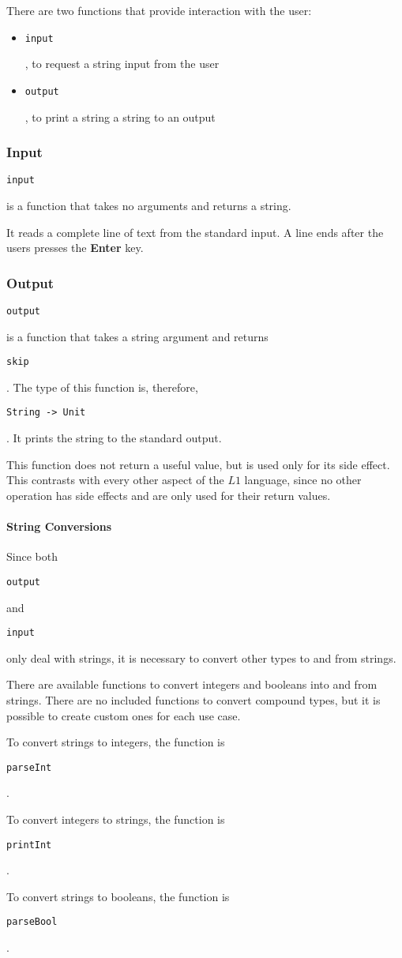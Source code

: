 \documentclass{article}
\def\code#1{\begin{footnotesize}\texttt{#1}\end{footnotesize}}
\begin{document}
There are two functions that provide interaction with the user:
  \begin{itemize}
    \item \code{input}, to request a string input from the user
    \item \code{output}, to print a string a string to an output
  \end{itemize}

\subsubsection{Input}

\code{input} is a function that takes no arguments and returns a string.

It reads a complete line of text from the standard input.
A line ends after the users presses the \textbf{Enter} key.

\subsubsection{Output}

\code{output} is a function that takes a string argument and returns \code{skip}.
The type of this function is, therefore, \code{String -> Unit}.
It prints the string to the standard output.

This function does not return a useful value, but is used only for its side effect.
This contrasts with every other aspect of the $L1$ language, since no other operation has side effects and are only used for their return values.

\paragraph{String Conversions}

Since both \code{output} and \code{input} only deal with strings, it is necessary to convert other types to and from strings.

There are available functions to convert integers and booleans into and from strings.
There are no included functions to convert compound types, but it is possible to create custom ones for each use case.

To convert strings to integers, the function is \code{parseInt}.

To convert integers to strings, the function is \code{printInt}.

To convert strings to booleans, the function is \code{parseBool}.
\end{document}
